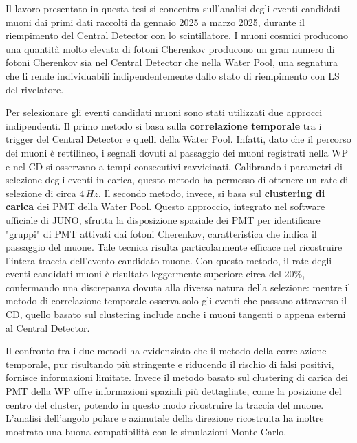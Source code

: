 Il lavoro presentato in questa tesi si concentra sull’analisi degli eventi candidati muoni dai primi dati raccolti da gennaio 2025 a marzo 2025, durante il riempimento del Central Detector con lo scintillatore. I muoni cosmici producono una quantità molto elevata di fotoni Cherenkov producono un gran numero di fotoni Cherenkov sia nel Central Detector che nella Water Pool, una segnatura che li rende individuabili indipendentemente dallo stato di riempimento con LS del rivelatore.

Per selezionare gli eventi candidati muoni sono stati utilizzati due approcci indipendenti. Il primo metodo si basa sulla \textbf{correlazione temporale} tra i trigger del Central Detector e quelli della Water Pool. Infatti, dato che il percorso dei muoni è rettilineo, i segnali dovuti al passaggio dei muoni registrati nella WP e nel CD si osservano a tempi consecutivi ravvicinati. Calibrando i parametri di selezione degli eventi in carica, questo metodo ha permesso di ottenere un rate di selezione di circa $4\,\unit{Hz}$.
Il secondo metodo, invece, si basa sul \textbf{clustering di carica} dei PMT della Water Pool. Questo approccio, integrato nel software ufficiale di JUNO, sfrutta la disposizione spaziale dei PMT per identificare "gruppi" di PMT attivati dai fotoni Cherenkov, caratteristica che indica il passaggio del muone. Tale tecnica risulta particolarmente efficace nel ricostruire l'intera traccia dell'evento candidato muone. Con questo metodo, il rate degli eventi candidati muoni è risultato leggermente superiore circa del $20\%$, confermando una discrepanza dovuta alla diversa natura della selezione: mentre il metodo di correlazione temporale osserva solo gli eventi che passano attraverso il CD, quello basato sul clustering include anche i muoni tangenti o appena esterni al Central Detector.

Il confronto tra i due metodi ha evidenziato che il metodo della correlazione temporale, pur risultando più stringente e riducendo il rischio di falsi positivi, fornisce informazioni limitate. Invece il metodo basato sul clustering di carica dei PMT della WP offre informazioni spaziali più dettagliate, come la posizione del centro del cluster, potendo in questo modo ricostruire la traccia del muone. L’analisi dell’angolo polare e azimutale della direzione ricostruita ha inoltre mostrato una buona compatibilità con le simulazioni Monte Carlo.

